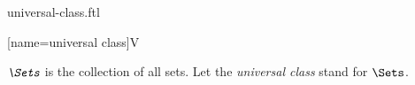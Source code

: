\documentclass{stex}
\begin{document}
\begin{smodule}{universal-class.ftl}


[name=universal class]{\mathbb V}

\begin{definition*}[forthel,for=universal class]
  $\emph{\Sets}$ is the collection of all sets.
  Let the \emph{universal class} stand for $\Sets$.
\end{definition*}

\end{smodule}
\end{document}
